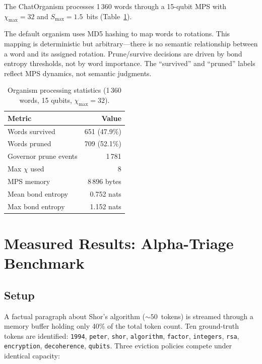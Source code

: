 \documentclass{article}
\begin{document}
The ChatOrganism processes 1\,360 words through a 15-qubit MPS with $\chi_{\max}=32$ and $S_{\max}=1.5$~bits (Table~\ref{tab:organism}).

The default organism uses MD5 hashing to map words to rotations.  This mapping is deterministic but arbitrary---there is no semantic relationship between a word and its assigned rotation.  Prune/survive decisions are driven by bond entropy thresholds, not by word importance.  The ``survived'' and ``pruned'' labels reflect MPS dynamics, not semantic judgments.

\begin{table}[h]
  \caption{Organism processing statistics (1\,360 words, 15 qubits, $\chi_{\max}\!=\!32$).}
  \label{tab:organism}
  \centering
  \begin{tabular}{lr}
    \toprule
    Metric & Value \\
    \midrule
    Words survived        & 651 (47.9\%) \\
    Words pruned          & 709 (52.1\%) \\
    Governor prune events & 1\,781 \\
    Max $\chi$ used       & 8 \\
    MPS memory            & 8\,896 bytes \\
    Mean bond entropy     & 0.752 nats \\
    Max bond entropy      & 1.152 nats \\
    \bottomrule
  \end{tabular}
\end{table}

\section{Measured Results: Alpha-Triage Benchmark}
\label{sec:benchmark}

\subsection{Setup}

A factual paragraph about Shor's algorithm (${\sim}50$~tokens) is streamed through a memory buffer holding only 40\% of the total token count.
Ten ground-truth tokens are identified:
\texttt{1994}, \texttt{peter}, \texttt{shor}, \texttt{algorithm}, \texttt{factor},
\texttt{integers}, \texttt{rsa}, \texttt{encryption}, \texttt{decoherence}, \texttt{qubits}.
Three eviction policies compete under identical capacity:
\end{document}
